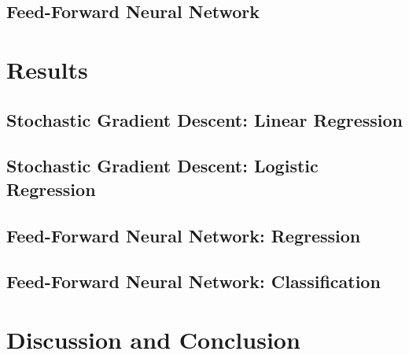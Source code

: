 \documentclass[]{article}
\begin{document}
\subsection{Feed-Forward Neural Network}

\clearpage
\section{Results} \label{results}

\subsection{Stochastic Gradient Descent: Linear Regression}


\subsection{Stochastic Gradient Descent: Logistic Regression}


\subsection{Feed-Forward Neural Network: Regression}


\subsection{Feed-Forward Neural Network: Classification}



\clearpage
\section{Discussion and Conclusion} \label{conclusion}

\clearpage


\end{document}
